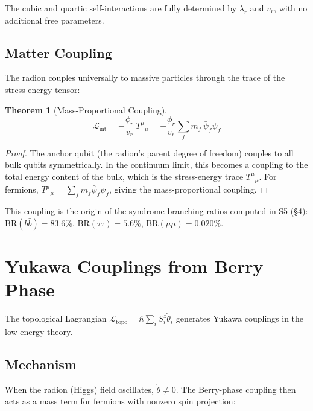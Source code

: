 \documentclass[11pt,a4paper]{article}
\newtheorem{theorem}{Theorem}[section]
\theoremstyle{definition}
\theoremstyle{remark}
\newcommand{\LL}{\mathcal{L}}
\begin{document}
The cubic and quartic self-interactions are fully determined by $\lambda_r$ and $v_r$, with no additional free parameters.

\subsection{Matter Coupling}

The radion couples universally to massive particles through the trace of the stress-energy tensor:

\begin{theorem}[Mass-Proportional Coupling]
\label{thm:coupling}
\begin{equation}
\boxed{\LL_{\mathrm{int}} = -\frac{\phi_r}{v_r}\,T^\mu{}_\mu = -\frac{\phi_r}{v_r}\sum_f m_f\,\bar{\psi}_f\psi_f}
\end{equation}
\end{theorem}

\begin{proof}
The anchor qubit (the radion's parent degree of freedom) couples to all bulk qubits symmetrically. In the continuum limit, this becomes a coupling to the total energy content of the bulk, which is the stress-energy trace $T^\mu{}_\mu$. For fermions, $T^\mu{}_\mu = \sum_f m_f\bar{\psi}_f\psi_f$, giving the mass-proportional coupling.
\end{proof}

This coupling is the origin of the syndrome branching ratios computed in S5 (\S4): $\mathrm{BR}(b\bar{b}) = 83.6\%$, $\mathrm{BR}(\tau\tau) = 5.6\%$, $\mathrm{BR}(\mu\mu) = 0.020\%$.

\section{Yukawa Couplings from Berry Phase}
\label{sec:yukawa}

The topological Lagrangian $\LL_{\mathrm{topo}} = \hbar\sum_i S_i^z\dot{\theta}_i$ generates Yukawa couplings in the low-energy theory.

\subsection{Mechanism}

When the radion (Higgs) field oscillates, $\dot{\theta} \neq 0$. The Berry-phase coupling then acts as a mass term for fermions with nonzero spin projection:
\end{document}

